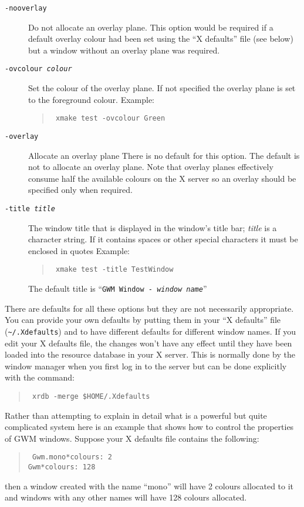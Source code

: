 \documentclass[twoside,11pt]{article}
\newcommand{\htmlref}[2]{#1}
\newcommand{\xlabel}[1]{}
\renewcommand{\_}{\texttt{\symbol{95}}}
\begin{document}
\begin{description}
\item[{\tt -nooverlay}] Do not allocate an overlay plane. This option
would be required if a default overlay colour had been set using the ``X
defaults'' file \htmlref{(see below)}{xdefaults} but a window without an 
overlay plane was required.

\item[{\tt -ovcolour {\em colour}}]
Set the colour of the overlay plane. If not specified the overlay plane is set
to the foreground colour. Example:
\begin{quote}{\tt
xmake test -ovcolour Green}
\end{quote}

\item[{\tt -overlay}] Allocate an overlay plane
There is no default for this option. The default is not to
allocate an overlay plane. Note that overlay planes effectively consume half
the available colours on the X server so an overlay should be specified only
when required.

\item[{\tt -title {\em title}}] The window title that is displayed in the
window's title bar;
{\em title} is a character string. If it contains spaces or other
special characters it must be enclosed in quotes 
Example:
\begin{quote}{\tt
xmake test -title Test\_Window}
\end{quote}
The default title is ``{\tt{GWM Window - }{\em window name}}''

\end{description}

\label{xdefaults}\xlabel{xdefaults}There are defaults 
for all these options but they are not 
necessarily appropriate. You can provide your own defaults by putting
them in your ``X defaults'' file ({\tt\~{}/.Xdefaults}) 
and to have different defaults for different window names. If you 
edit your X defaults file, the changes won't have any effect until they
have been loaded into the resource database in your X server. This is normally
done by the window manager when you first log in to the server but can 
be done explicitly with the command:
\begin{quote}{\tt
xrdb -merge \$HOME/.Xdefaults}
\end{quote}

Rather than attempting to explain in detail what is a powerful but quite
complicated system here is an example that shows how to control the properties
of GWM windows. Suppose your X defaults file contains the following:
\begin{quote}{\tt
Gwm.mono*colours: 2\\
Gwm*colours: 128}
\end{quote}
then a window created with the name ``mono'' will have 2 colours allocated to
it and windows with any other names will have 128 colours allocated.
\end{document}
